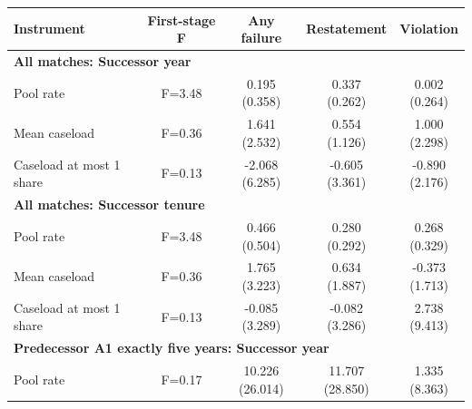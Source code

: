 \documentclass[10pt]{article}
\newcommand{\sym}[1]{\textsuperscript{#1}}
\begin{document}
\begin{minipage}{19cm}\fontsize{10}{12}\selectfont\setlength{\tabcolsep}{4pt}\renewcommand{\arraystretch}{1.12}


\def\sym#1{\ifmmode^{#1}\else\(^{#1}\)\fi}
\centering
{}
\begin{threeparttable}
\begin{tabular}{p{}cccc}
\toprule
Instrument & First-stage F & Any failure & Restatement & Violation \\
\midrule
\multicolumn{5}{l}{\textbf{All matches: Successor year}} \\
Pool rate & F=3.48 & \shortstack{0.195\\(0.358)} & \shortstack{0.337\\(0.262)} & \shortstack{0.002\\(0.264)} \\
Mean caseload & F=0.36 & \shortstack{1.641\\(2.532)} & \shortstack{0.554\\(1.126)} & \shortstack{1.000\\(2.298)} \\
Caseload at most 1 share & F=0.13 & \shortstack{-2.068\\(6.285)} & \shortstack{-0.605\\(3.361)} & \shortstack{-0.890\\(2.176)} \\
\multicolumn{5}{l}{\textbf{All matches: Successor tenure}} \\
Pool rate & F=3.48 & \shortstack{0.466\\(0.504)} & \shortstack{0.280\\(0.292)} & \shortstack{0.268\\(0.329)} \\
Mean caseload & F=0.36 & \shortstack{1.765\\(3.223)} & \shortstack{0.634\\(1.887)} & \shortstack{-0.373\\(1.713)} \\
Caseload at most 1 share & F=0.13 & \shortstack{-0.085\\(3.289)} & \shortstack{-0.082\\(3.286)} & \shortstack{2.738\\(9.413)} \\
\multicolumn{5}{l}{\textbf{Predecessor A1 exactly five years: Successor year}} \\
Pool rate & F=0.17 & \shortstack{10.226\\(26.014)} & \shortstack{11.707\\(28.850)} & \shortstack{1.335\\(8.363)} \\

\end{tabular}
\end{threeparttable}
\end{minipage}
\end{document}
